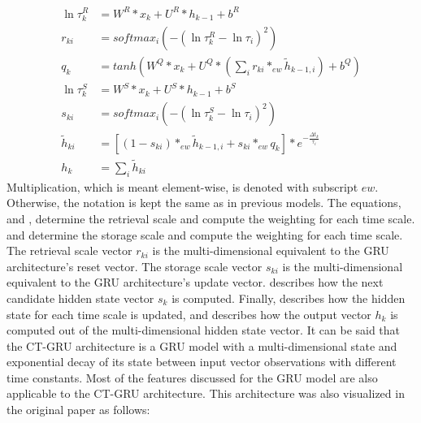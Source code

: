 \documentclass[draft,final]{vutinfth} %
\begin{document}
    \begin{align}
        \label{retrieval_scale}
        \ln{\tau_k^R} &= W^R*x_k + U^R*h_{k-1} + b^R \\
        \label{retrieval_weighting}
        r_{ki} &= softmax_i(-(\ln{\tau_k^R-\ln{\tau_i}})^2) \\
        \label{relevant_event_signals}
        q_k &= tanh(W^Q*x_k + U^Q*(\sum_i {r_{ki} *_{ew} \tilde{h}_{k-1,i}}) + b^Q) \\
        \label{storage_scale}
        \ln{\tau_k^S} &= W^S*x_k + U^S*h_{k-1} + b^S \\
        \label{storage_weighting}
        s_{ki} &= softmax_i(-(\ln{\tau_k^S-\ln{\tau_i}})^2) \\
        \label{state_update}
        \tilde{h}_{ki} &= [(1 - s_{ki}) *_{ew} \tilde{h}_{k-1,i} + s_{ki} *_{ew} q_k] * e^{-\frac{\Delta t_k}{\tau_i}} \\
        \label{state_output}
        h_k &= \sum_i{\tilde{h}_{ki}}
    \end{align}
    Multiplication, which is meant element-wise, is denoted with subscript $ew$. Otherwise, the notation is kept the same as in previous models.
    The equations,  and , determine the retrieval scale and compute the weighting for each time scale.
     and  determine the storage scale and compute the weighting for each time scale.
    The retrieval scale vector $r_{ki}$ is the multi-dimensional equivalent to the GRU architecture's reset vector. The storage scale vector $s_{ki}$ is the multi-dimensional equivalent to the GRU architecture's update vector.
     describes how the next candidate hidden state vector $s_k$ is computed.
    Finally,  describes how the hidden state for each time scale is updated, and  describes how the output vector $h_k$ is computed out of the multi-dimensional hidden state vector.
    It can be said that the CT-GRU architecture is a GRU model with a multi-dimensional state and exponential decay of its state between input vector observations with different time constants.
    Most of the features discussed for the GRU model are also applicable to the CT-GRU architecture.
    This architecture was also visualized in the original paper as follows:
\end{document}
